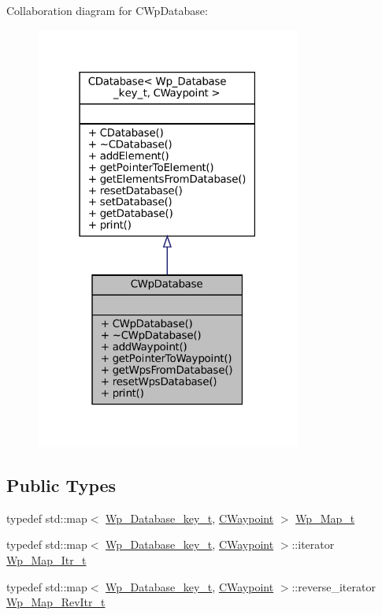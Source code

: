 Collaboration diagram for C\+Wp\+Database\+:
\nopagebreak
\begin{figure}[H]
\begin{center}
\leavevmode
\includegraphics[width=247pt]{classCWpDatabase__coll__graph}
\end{center}
\end{figure}
\subsection*{Public Types}
\begin{DoxyCompactItemize}
\item 
typedef std\+::map$<$ \hyperlink{CWpDatabase_8h_af4bde7780fd7a000e6647ae788fe5a10}{Wp\+\_\+\+Database\+\_\+key\+\_\+t}, \hyperlink{classCWaypoint}{C\+Waypoint} $>$ \hyperlink{classCWpDatabase_acdf43fd8206955eeb54807e9254958cb}{Wp\+\_\+\+Map\+\_\+t}
\item 
typedef std\+::map$<$ \hyperlink{CWpDatabase_8h_af4bde7780fd7a000e6647ae788fe5a10}{Wp\+\_\+\+Database\+\_\+key\+\_\+t}, \hyperlink{classCWaypoint}{C\+Waypoint} $>$\+::iterator \hyperlink{classCWpDatabase_a3fbf501fb525f4f45171e7811596fc10}{Wp\+\_\+\+Map\+\_\+\+Itr\+\_\+t}
\item 
typedef std\+::map$<$ \hyperlink{CWpDatabase_8h_af4bde7780fd7a000e6647ae788fe5a10}{Wp\+\_\+\+Database\+\_\+key\+\_\+t}, \hyperlink{classCWaypoint}{C\+Waypoint} $>$\+::reverse\+\_\+iterator \hyperlink{classCWpDatabase_ae28984b70adcf73331968295206fba5d}{Wp\+\_\+\+Map\+\_\+\+Rev\+Itr\+\_\+t}
\end{DoxyCompactItemize}
